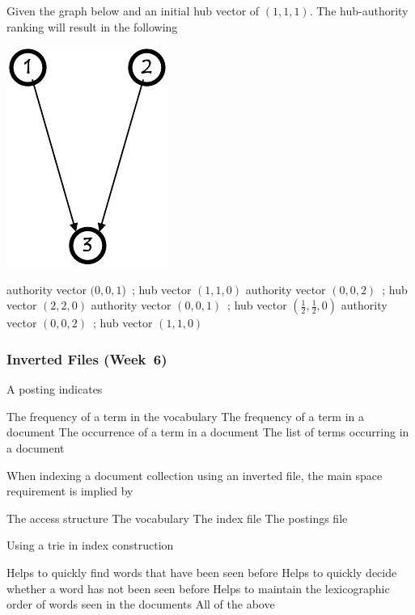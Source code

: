 \documentclass[12pt,a4paper,answers]{exam} %
\begin{document}
\begin{flushleft}
\begin{multicols*}{2}
\begin{questions}
\question Given the graph below and an initial hub vector of $(1,1,1)$. The hub-authority ranking will result in the following
\begin{colfig}
\includegraphics[scale=0.3]{w5_s56}
\end{colfig}
\begin{checkboxes}
\choice authority vector $(0,0,1$)~; hub vector $(1,1,0)$
\choice authority vector $(0,0,2)$~; hub vector $(2,2,0)$
\CorrectChoice authority vector $(0,0,1)$~; hub vector $(\frac{1}{2},\frac{1}{2},0)$
\choice authority vector $(0,0,2)$~; hub vector $(1,1,0)$
\end{checkboxes}


\subsubsection{Inverted Files (Week~6)}

\question A posting indicates
\begin{checkboxes}
\choice The frequency of a term in the vocabulary
\choice The frequency of a term in a document
\CorrectChoice The occurrence of a term in a document
\choice The list of terms occurring in a document
\end{checkboxes}

\question When indexing a document collection using an inverted file, the main space requirement is implied by
\begin{checkboxes}
\choice The access structure
\choice The vocabulary
\choice The index file
\CorrectChoice The postings file
\end{checkboxes}

\question Using a trie in index construction
\begin{checkboxes}
\choice Helps to quickly find words that have been seen before
\choice Helps to quickly decide whether a word has not been seen before
\choice Helps to maintain the lexicographic order of words seen in the documents
\CorrectChoice All of the above
\end{checkboxes}


\end{questions}
\end{multicols*}
\end{flushleft}
\end{document}
